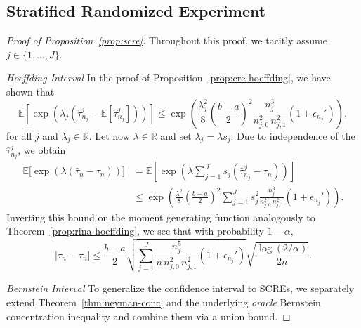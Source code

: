 \documentclass[aos]{imsart2}
\theoremstyle{plain}
\theoremstyle{definition}
\newcommand{\R}{\mathbb{R}}
\newcommand{\E}{\mathbb{E}}
\newcommand{\tauh}{\hat{\tau}}
\begin{document}
\begin{appendix}
\subsection{Stratified Randomized Experiment}\label{app:scre}

\begin{proof}[Proof of Proposition~\ref{prop:scre}]
    Throughout this proof, we tacitly assume $j\in \{1,\ldots,J\}$.

    \textit{Hoeffding Interval} In the proof of Proposition~\ref{prop:cre-hoeffding}, we have shown that
    \begin{equation*}
        \E\left[\exp\left(\lambda_j (\tauh_{n_j}^j - \E[\tauh_{n_j}^j])\right)\right] \leq
        \exp\left(\frac{\lambda_j^2}{8}\left(\frac{b-a}{2}\right)^2 \frac{n_j^3}{n_{j,0}^2\,n_{j,1}^2} (1+\epsilon_{n_j}')\right),
    \end{equation*}
    for all $j$ and $\lambda_j \in \R$. Let now $\lambda \in \R$ and set $\lambda_j = \lambda s_j$. Due to independence of the $\tauh_{n_j}^j$, we obtain
    \begin{align*}
        \E\Big[\exp\left(\lambda (\tauh_n-\tau_n)\right)\Big] &=
        \E\left[\exp\left(\lambda \sum_{j=1}^J s_j (\tauh_{n_j}^j - \tau_n)\right)\right] \\
        &\leq \exp\left(
        \frac{\lambda^2}{8} \left(\frac{b-a}{2}\right)^2 \sum_{j=1}^J s_j^2 \frac{n_j^3}{n_{j,0}^2\,n_{j,1}^2} (1+\epsilon_{n_j}')\right).
    \end{align*}
    Inverting this bound on the moment generating function analogously to Theorem~\ref{prop:rina-hoeffding}, we see that with probability $1-\alpha$,
    \begin{equation*}
        \left\vert \tauh_n-\tau_n \right\vert \leq \frac{b-a}{2} \sqrt{\sum_{j=1}^J \frac{n_j^5}{n\, n_{j,0}^2\,n_{j,1}^2}(1+\epsilon_{n_j}')}\sqrt{\frac{\log(2/\alpha)}{2n}}.
    \end{equation*}

    \textit{Bernstein Interval} To generalize the confidence interval to SCREs, we separately extend Theorem~\ref{thm:neyman-conc} and the underlying \emph{oracle} Bernstein concentration inequality and combine them via a union bound.


\end{proof}
\end{appendix}
\end{document}
